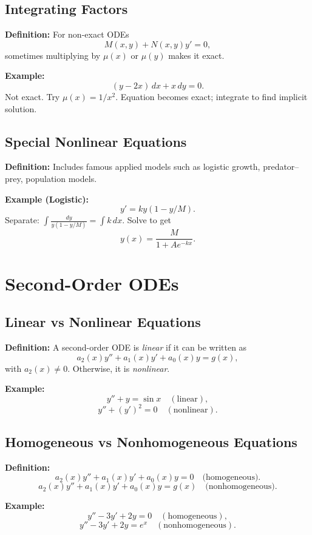 \documentclass[12pt]{book}
\begin{document}
\chapter{Integrating Factors}
\textbf{Definition:} For non-exact ODEs
\[
M(x,y) + N(x,y)y' = 0,
\]
sometimes multiplying by \(\mu(x)\) or \(\mu(y)\) makes it exact.

\textbf{Example:}
\[
(y - 2x)\,dx + x\,dy = 0.
\]
Not exact. Try \(\mu(x) = 1/x^2\).  
Equation becomes exact; integrate to find implicit solution.

\chapter{Special Nonlinear Equations}
\textbf{Definition:} Includes famous applied models such as logistic growth, predator–prey, population models.

\textbf{Example (Logistic):}
\[
y' = ky(1 - y/M).
\]
Separate:
\(\int \frac{dy}{y(1-y/M)} = \int k\,dx.\)  
Solve to get
\[
y(x) = \frac{M}{1 + Ae^{-kx}}.
\]

\part{Second-Order ODEs}

\chapter{Linear vs Nonlinear Equations}
\textbf{Definition:} A second-order ODE is \emph{linear} if it can be written as
\[
a_2(x) y'' + a_1(x) y' + a_0(x) y = g(x),
\]
with $a_2(x)\neq 0$. Otherwise, it is \emph{nonlinear}.

\textbf{Example:}
\[
y'' + y = \sin x \quad (\text{linear}),
\]
\[
y'' + (y')^2 = 0 \quad (\text{nonlinear}).
\]

\chapter{Homogeneous vs Nonhomogeneous Equations}
\textbf{Definition:}
\[
a_2(x)y'' + a_1(x)y' + a_0(x)y = 0 \quad \text{(homogeneous)}.
\]
\[
a_2(x)y'' + a_1(x)y' + a_0(x)y = g(x) \quad \text{(nonhomogeneous)}.
\]

\textbf{Example:}
\[
y'' - 3y' + 2y = 0 \quad (\text{homogeneous}),
\]
\[
y'' - 3y' + 2y = e^x \quad (\text{nonhomogeneous}).
\]

\end{document}
